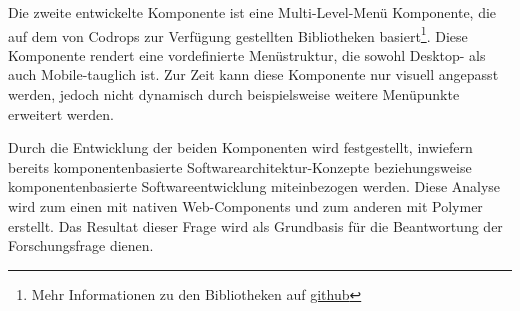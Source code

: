 Die zweite entwickelte Komponente ist eine \glqq Multi-Level\grqq -Menü Komponente, die auf dem von Codrops zur Verfügung gestellten Bibliotheken basiert\footnote{Mehr Informationen zu den Bibliotheken auf \href{https://github.com/codrops/MultiLevelPushMenu}{github}}. Diese Komponente rendert eine vordefinierte Menüstruktur, die sowohl Desktop- als auch Mobile-tauglich ist. Zur Zeit kann diese Komponente nur visuell angepasst werden, jedoch nicht dynamisch durch beispielsweise weitere Menüpunkte erweitert werden.

Durch die Entwicklung der beiden Komponenten wird festgestellt, inwiefern bereits komponentenbasierte Softwarearchitektur-Konzepte beziehungsweise komponentenbasierte Softwareentwicklung miteinbezogen werden. Diese Analyse wird zum einen mit nativen Web-Components und zum anderen mit Polymer erstellt. Das Resultat dieser Frage wird als Grundbasis für die Beantwortung der Forschungsfrage dienen.